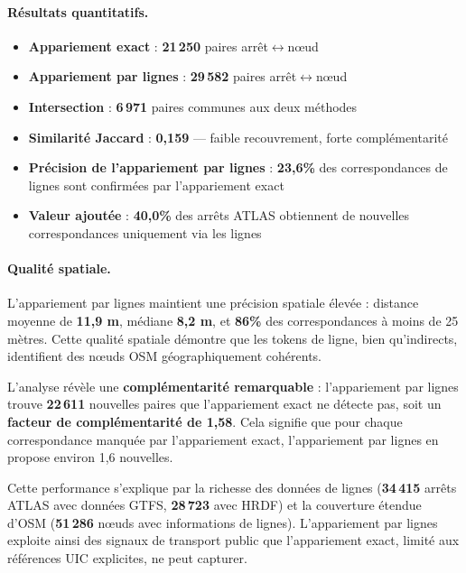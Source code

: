 \paragraph{Résultats quantitatifs.}
\begin{itemize}
  \item \textbf{Appariement exact} : \textbf{21\,250} paires arrêt$\leftrightarrow$nœud
  \item \textbf{Appariement par lignes} : \textbf{29\,582} paires arrêt$\leftrightarrow$nœud
  \item \textbf{Intersection} : \textbf{6\,971} paires communes aux deux méthodes
  \item \textbf{Similarité Jaccard} : \textbf{0,159} — faible recouvrement, forte complémentarité
  \item \textbf{Précision de l'appariement par lignes} : \textbf{23,6\%} des correspondances de lignes sont confirmées par l'appariement exact
  \item \textbf{Valeur ajoutée} : \textbf{40,0\%} des arrêts ATLAS obtiennent de nouvelles correspondances uniquement via les lignes
\end{itemize}

\paragraph{Qualité spatiale.} L'appariement par lignes maintient une précision spatiale élevée : distance moyenne de \textbf{11,9 m}, médiane \textbf{8,2 m}, et \textbf{86\%} des correspondances à moins de 25 mètres. Cette qualité spatiale démontre que les tokens de ligne, bien qu'indirects, identifient des nœuds OSM géographiquement cohérents.

L'analyse révèle une \textbf{complémentarité remarquable} : l'appariement par lignes trouve \textbf{22\,611} nouvelles paires que l'appariement exact ne détecte pas, soit un \textbf{facteur de complémentarité de 1,58}. Cela signifie que pour chaque correspondance manquée par l'appariement exact, l'appariement par lignes en propose environ 1,6 nouvelles.

Cette performance s'explique par la richesse des données de lignes (\textbf{34\,415} arrêts ATLAS avec données GTFS, \textbf{28\,723} avec HRDF) et la couverture étendue d'OSM (\textbf{51\,286} nœuds avec informations de lignes). L'appariement par lignes exploite ainsi des signaux de transport public que l'appariement exact, limité aux références UIC explicites, ne peut capturer.

